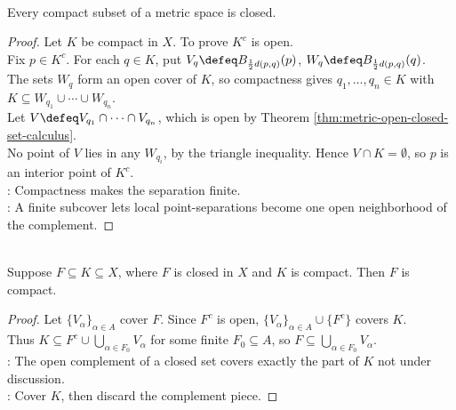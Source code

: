\begin{theorem} \label{thm:compact-subsets-of-metric-spaces-closed} \\
Every compact subset of a metric space is closed.
\begin{proof}
Let $K$ be compact in $X$. To prove $K^c$ is open.\\
Fix $p\in K^c$. For each $q\in K$, put $V_q\defeq B_{\frac12d(p,q)}(p)$, $W_q\defeq B_{\frac12d(p,q)}(q)$.\\
The sets $W_q$ form an open cover of $K$, so compactness gives $q_1,\ldots,q_n\in K$ with $K\subseteq W_{q_1}\cup\cdots\cup W_{q_n}$.\\
Let $V\defeq V_{q_1}\cap\cdots\cap V_{q_n}$, which is open by Theorem \ref{thm:metric-open-closed-set-calculus}.\\
No point of $V$ lies in any $W_{q_i}$, by the triangle inequality. Hence $V\cap K=\emptyset$, so $p$ is an interior point of $K^c$.\\
: Compactness makes the separation finite.\\
: A finite subcover lets local point-separations become one open neighborhood of the complement.
\end{proof}
\end{theorem}

\begin{theorem} \label{thm:closed-subsets-of-compact-sets-compact} \\
Suppose $F\subseteq K\subseteq X$, where $F$ is closed in $X$ and $K$ is compact. Then $F$ is compact.
\begin{proof}
Let $\{V_\alpha\}_{\alpha\in A}$ cover $F$. Since $F^c$ is open, $\{V_\alpha\}_{\alpha\in A}\cup\{F^c\}$ covers $K$.\\
Thus $K\subseteq F^c\cup\bigcup\limits_{\alpha\in F_0}V_\alpha$ for some finite $F_0\subseteq A$, so $F\subseteq\bigcup\limits_{\alpha\in F_0}V_\alpha$.\\
: The open complement of a closed set covers exactly the part of $K$ not under discussion.\\
: Cover $K$, then discard the complement piece.
\end{proof}
\end{theorem}

